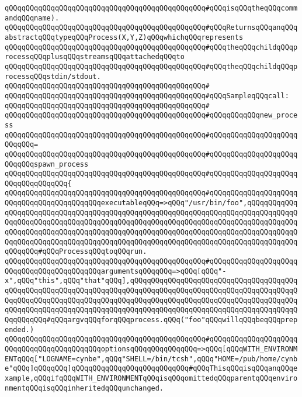 \verb|qQQqqQQqqQQqqQQqqQQqqQQqqQQqqQQqqQQqqQQqqQQqqQQq#qQQqisqQQqtheqQQqcommandqQQqname).|\newline
\verb|qQQqqQQqqQQqqQQqqQQqqQQqqQQqqQQqqQQqqQQqqQQqqQQq#qQQqReturnsqQQqanqQQqabstractqQQqtypeqQQqProcess(X,Y,Z)qQQqwhichqQQqrepresents|\newline
\verb|qQQqqQQqqQQqqQQqqQQqqQQqqQQqqQQqqQQqqQQqqQQqqQQq#qQQqtheqQQqchildqQQqprocessqQQqplusqQQqstreamsqQQqattachedqQQqto|\newline
\verb|qQQqqQQqqQQqqQQqqQQqqQQqqQQqqQQqqQQqqQQqqQQqqQQq#qQQqtheqQQqchildqQQqprocessqQQqstdin/stdout.|\newline
\verb|qQQqqQQqqQQqqQQqqQQqqQQqqQQqqQQqqQQqqQQqqQQqqQQq#|\newline
\verb|qQQqqQQqqQQqqQQqqQQqqQQqqQQqqQQqqQQqqQQqqQQqqQQq#qQQqSampleqQQqcall:|\newline
\verb|qQQqqQQqqQQqqQQqqQQqqQQqqQQqqQQqqQQqqQQqqQQqqQQq#|\newline
\verb|qQQqqQQqqQQqqQQqqQQqqQQqqQQqqQQqqQQqqQQqqQQqqQQq#qQQqqQQqqQQqnew_process|\newline
\verb|qQQqqQQqqQQqqQQqqQQqqQQqqQQqqQQqqQQqqQQqqQQqqQQq#qQQqqQQqqQQqqQQqqQQqqQQqqQQq=|\newline
\verb|qQQqqQQqqQQqqQQqqQQqqQQqqQQqqQQqqQQqqQQqqQQqqQQq#qQQqqQQqqQQqqQQqqQQqqQQqqQQqspawn_process|\newline
\verb|qQQqqQQqqQQqqQQqqQQqqQQqqQQqqQQqqQQqqQQqqQQqqQQq#qQQqqQQqqQQqqQQqqQQqqQQqqQQqqQQqqQQq{|\newline
\verb|qQQqqQQqqQQqqQQqqQQqqQQqqQQqqQQqqQQqqQQqqQQqqQQq#qQQqqQQqqQQqqQQqqQQqqQQqqQQqqQQqqQQqqQQqqQQqexecutableqQQq=>qQQq"/usr/bin/foo",qQQqqQQqqQQqqQQqqQQqqQQqqQQqqQQqqQQqqQQqqQQqqQQqqQQqqQQqqQQqqQQqqQQqqQQqqQQqqQQqqQQqqQQqqQQqqQQqqQQqqQQqqQQqqQQqqQQqqQQqqQQqqQQqqQQqqQQqqQQqqQQqqQQqqQQqqQQqqQQqqQQqqQQqqQQqqQQqqQQqqQQqqQQqqQQqqQQqqQQqqQQqqQQqqQQqqQQqqQQqqQQqqQQqqQQqqQQqqQQqqQQqqQQqqQQqqQQqqQQqqQQqqQQqqQQqqQQqqQQqqQQqqQQqqQQqqQQqqQQq#qQQqProcessqQQqtoqQQqrun.|\newline
\verb|qQQqqQQqqQQqqQQqqQQqqQQqqQQqqQQqqQQqqQQqqQQqqQQq#qQQqqQQqqQQqqQQqqQQqqQQqqQQqqQQqqQQqqQQqqQQqargumentsqQQqqQQq=>qQQq[qQQq"-x",qQQq"this",qQQq"that"qQQq],qQQqqQQqqQQqqQQqqQQqqQQqqQQqqQQqqQQqqQQqqQQqqQQqqQQqqQQqqQQqqQQqqQQqqQQqqQQqqQQqqQQqqQQqqQQqqQQqqQQqqQQqqQQqqQQqqQQqqQQqqQQqqQQqqQQqqQQqqQQqqQQqqQQqqQQqqQQqqQQqqQQqqQQqqQQqqQQqqQQqqQQqqQQqqQQqqQQqqQQqqQQqqQQqqQQqqQQqqQQqqQQqqQQqqQQqqQQqqQQqqQQqqQQqqQQqqQQqqQQq#qQQqargvqQQqforqQQqprocess.qQQq("foo"qQQqwillqQQqbeqQQqprepended.)|\newline
\verb|qQQqqQQqqQQqqQQqqQQqqQQqqQQqqQQqqQQqqQQqqQQqqQQq#qQQqqQQqqQQqqQQqqQQqqQQqqQQqqQQqqQQqqQQqqQQqoptionsqQQqqQQqqQQqqQQq=>qQQq[qQQqWITH_ENVIRONMENTqQQq["LOGNAME=cynbe",qQQq"SHELL=/bin/tcsh",qQQq"HOME=/pub/home/cynbe"qQQq]qQQqqQQq]qQQqqQQqqQQqqQQqqQQqqQQqqQQq#qQQqThisqQQqisqQQqanqQQqexample,qQQqifqQQqWITH_ENVIRONMENTqQQqisqQQqomittedqQQqparentqQQqenvironmentqQQqisqQQqinheritedqQQqunchanged.|\newline
